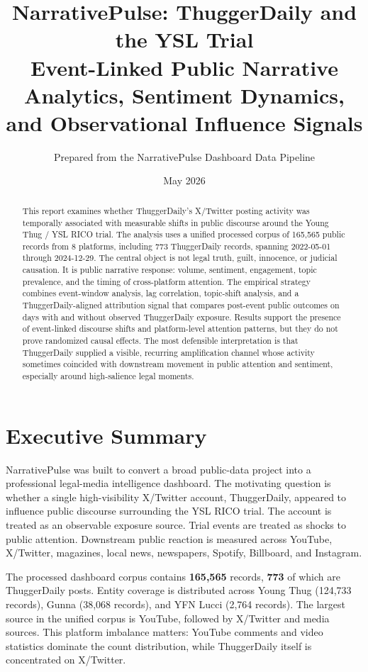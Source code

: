 \documentclass[12pt]{article}
\title{\textbf{NarrativePulse: ThuggerDaily and the YSL Trial}\\
\large Event-Linked Public Narrative Analytics, Sentiment Dynamics, and Observational Influence Signals}
\author{Prepared from the NarrativePulse Dashboard Data Pipeline}
\date{May 2026}
\begin{document}
\maketitle
\begin{abstract}
This report examines whether ThuggerDaily's X/Twitter posting activity was temporally associated with measurable shifts in public discourse around the Young Thug / YSL RICO trial. The analysis uses a unified processed corpus of 165,565 public records from 8 platforms, including 773 ThuggerDaily records, spanning 2022-05-01 through 2024-12-29. The central object is not legal truth, guilt, innocence, or judicial causation. It is public narrative response: volume, sentiment, engagement, topic prevalence, and the timing of cross-platform attention. The empirical strategy combines event-window analysis, lag correlation, topic-shift analysis, and a ThuggerDaily-aligned attribution signal that compares post-event public outcomes on days with and without observed ThuggerDaily exposure. Results support the presence of event-linked discourse shifts and platform-level attention patterns, but they do not prove randomized causal effects. The most defensible interpretation is that ThuggerDaily supplied a visible, recurring amplification channel whose activity sometimes coincided with downstream movement in public attention and sentiment, especially around high-salience legal moments.
\end{abstract}

\newpage
\tableofcontents
\newpage

\section{Executive Summary}
NarrativePulse was built to convert a broad public-data project into a professional legal-media intelligence dashboard. The motivating question is whether a single high-visibility X/Twitter account, ThuggerDaily, appeared to influence public discourse surrounding the YSL RICO trial. The account is treated as an observable exposure source. Trial events are treated as shocks to public attention. Downstream public reaction is measured across YouTube, X/Twitter, magazines, local news, newspapers, Spotify, Billboard, and Instagram.

The processed dashboard corpus contains \textbf{165,565} records, \textbf{773} of which are ThuggerDaily posts. Entity coverage is distributed across Young Thug (124,733 records), Gunna (38,068 records), and YFN Lucci (2,764 records). The largest source in the unified corpus is YouTube, followed by X/Twitter and media sources. This platform imbalance matters: YouTube comments and video statistics dominate the count distribution, while ThuggerDaily itself is concentrated on X/Twitter.
\end{document}
